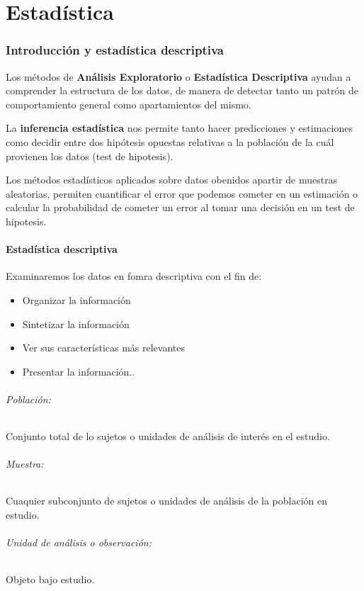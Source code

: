 \part{Estadística}
\section{Introducción y estadística descriptiva}
Los métodos de \textbf{Análisis Exploratorio} o \textbf{Estadística Descriptiva} ayudan a comprender la estructura de los datos, de manera de detectar tanto un patrón de comportamiento general como apartamientos del mismo.

La \textbf{inferencia estadística} nos permite tanto hacer predicciones y estimaciones como decidir entre dos hipótesis opuestas relativas a la población de la cuál provienen los datos (test de hipotesis).

Los métodos estadísticos aplicados sobre datos obenidos apartir de muestras aleatorias, permiten cuantificar el error que podemos cometer en un estimación o calcular la probabilidad de cometer un error al tomar una decisión en un test de hipotesis.

\subsection{Estadística descriptiva}
Examinaremos los datos en fomra descriptiva con el fin de:
\begin{itemize}
	\item Organizar la información
	\item Sintetizar la información
	\item Ver sus características más relevantes
	\item Presentar la información..
\end{itemize}

\paragraph{Población:} Conjunto total de lo sujetos o unidades de análisis de interés en el estudio.

\paragraph{Muestra:} Cuaquier subconjunto de sujetos o unidades de análisis de la población en estudio.

\paragraph{Unidad de análisis o observación:} Objeto bajo estudio.

